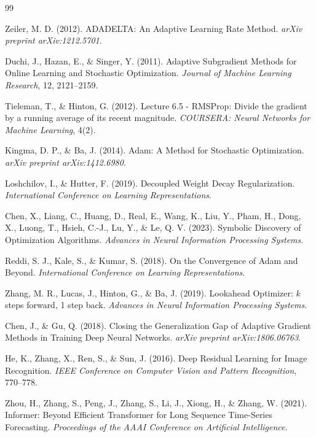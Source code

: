 \documentclass[11pt,a4paper]{article}
\begin{document}

\begin{thebibliography}{99}

Zeiler, M. D. (2012). ADADELTA: An Adaptive Learning Rate Method. \textit{arXiv preprint arXiv:1212.5701}.

Duchi, J., Hazan, E., \& Singer, Y. (2011). Adaptive Subgradient Methods for Online Learning and Stochastic Optimization. \textit{Journal of Machine Learning Research}, 12, 2121--2159.

Tieleman, T., \& Hinton, G. (2012). Lecture 6.5 - RMSProp: Divide the gradient by a running average of its recent magnitude. \textit{COURSERA: Neural Networks for Machine Learning}, 4(2).

Kingma, D. P., \& Ba, J. (2014). Adam: A Method for Stochastic Optimization. \textit{arXiv preprint arXiv:1412.6980}.

Loshchilov, I., \& Hutter, F. (2019). Decoupled Weight Decay Regularization. \textit{International Conference on Learning Representations}.

Chen, X., Liang, C., Huang, D., Real, E., Wang, K., Liu, Y., Pham, H., Dong, X., Luong, T., Hsieh, C.-J., Lu, Y., \& Le, Q. V. (2023). Symbolic Discovery of Optimization Algorithms. \textit{Advances in Neural Information Processing Systems}.

Reddi, S. J., Kale, S., \& Kumar, S. (2018). On the Convergence of Adam and Beyond. \textit{International Conference on Learning Representations}.

Zhang, M. R., Lucas, J., Hinton, G., \& Ba, J. (2019). Lookahead Optimizer: $k$ steps forward, 1 step back. \textit{Advances in Neural Information Processing Systems}.

Chen, J., \& Gu, Q. (2018). Closing the Generalization Gap of Adaptive Gradient Methods in Training Deep Neural Networks. \textit{arXiv preprint arXiv:1806.06763}.

He, K., Zhang, X., Ren, S., \& Sun, J. (2016). Deep Residual Learning for Image Recognition. \textit{IEEE Conference on Computer Vision and Pattern Recognition}, 770--778.

Zhou, H., Zhang, S., Peng, J., Zhang, S., Li, J., Xiong, H., \& Zhang, W. (2021). Informer: Beyond Efficient Transformer for Long Sequence Time-Series Forecasting. \textit{Proceedings of the AAAI Conference on Artificial Intelligence}.


\end{thebibliography}
\end{document}
